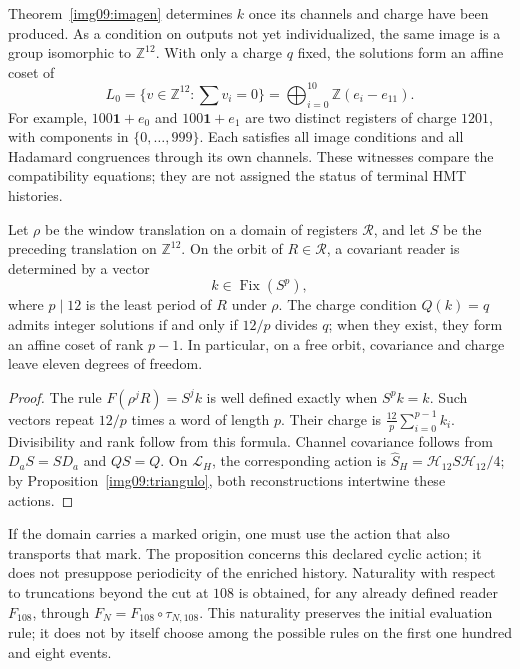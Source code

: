 Theorem~\ref{img09:imagen} determines $k$ once its channels
and charge have been produced. As a condition on outputs not yet
individualized, the same image is a group isomorphic to
$\mathbb Z^{12}$. With only a charge $q$ fixed, the solutions
form an affine coset of
\[
 L_0=\{v\in\mathbb Z^{12}:\sum v_i=0\}
 =\bigoplus_{i=0}^{10}\mathbb Z(e_i-e_{11}).
\]
For example, $100\mathbf1+e_0$ and $100\mathbf1+e_1$ are two
distinct registers of charge $1201$, with components in
$\{0,\ldots,999\}$. Each satisfies all image conditions
and all Hadamard congruences through its own
channels. These witnesses compare the compatibility equations;
they are not assigned the status of terminal HMT histories.

\begin{proposition}
\label{img09:covariancia}
Let $\rho$ be the window translation on a domain of registers
$\mathscr R$, and let $S$ be the preceding translation on $\mathbb Z^{12}$.
On the orbit of $R\in\mathscr R$, a covariant reader is
determined by a vector
\[
 k\in\operatorname{Fix}(S^p),
\]
where $p\mid12$ is the least period of $R$ under $\rho$.
The charge condition $Q(k)=q$ admits integer solutions if and only if
$12/p$ divides $q$; when they exist, they form an affine coset of rank
$p-1$. In particular, on a free orbit, covariance and charge
leave eleven degrees of freedom.
\end{proposition}
\begin{proof}
The rule $F(\rho^jR)=S^jk$ is well defined exactly when
$S^pk=k$. Such vectors repeat $12/p$ times a word of
length $p$. Their charge is $\frac{12}{p}\sum_{i=0}^{p-1}k_i$.
Divisibility and rank follow from this formula. Channel
covariance follows from $D_aS=SD_a$ and $QS=Q$.
On $\mathcal L_H$, the corresponding action is
$\widehat S_H=\mathcal H_{12}S\mathcal H_{12}/4$;
by Proposition~\ref{img09:triangulo}, both reconstructions
intertwine these actions.
\end{proof}

If the domain carries a marked origin, one must use the action that
also transports that mark. The proposition concerns this declared
cyclic action; it does not presuppose periodicity of the enriched
history. Naturality with respect to truncations beyond the cut at
$108$ is obtained, for any already defined reader $F_{108}$, through
$F_N=F_{108}\circ\tau_{N,108}$. This naturality preserves the initial
evaluation rule; it does not by itself choose among the possible rules
on the first one hundred and eight events.

